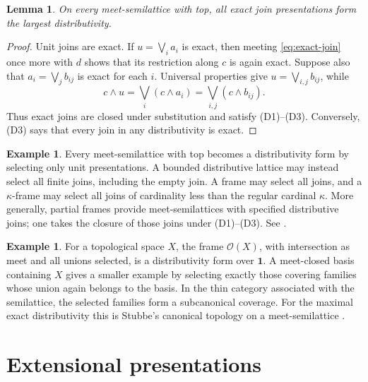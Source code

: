 \documentclass[12pt,oneside,reqno]{amsart}
\newtheorem{lemma}[theorem]{Lemma}
\theoremstyle{definition}
\newtheorem{example}[theorem]{Example}
\theoremstyle{remark}
\begin{document}
\begin{lemma}\label{lem:maximal-exact-distributivity}
On every meet-semilattice with top, all exact join presentations form
the largest distributivity.
\end{lemma}

\begin{proof}
Unit joins are exact.  If \(u=\bigvee_i a_i\) is exact, then meeting
\eqref{eq:exact-join} once more with \(d\) shows that its restriction
along \(c\) is again exact.  Suppose also that
\(a_i=\bigvee_jb_{ij}\) is exact for each \(i\).  Universal properties
give \(u=\bigvee_{i,j}b_{ij}\), while
\[
 c\wedge u
 =\bigvee_i(c\wedge a_i)
 =\bigvee_{i,j}(c\wedge b_{ij}).
\]
Thus exact joins are closed under substitution and satisfy (D1)--(D3).
Conversely, (D3) says that every join in any distributivity is exact.
\end{proof}

\begin{example}\label{ex:terminal-examples}
Every meet-semilattice with top becomes a distributivity form by
selecting only unit presentations.  A bounded distributive lattice may
instead select all finite joins, including the empty join.  A frame may
select all joins, and a \(\kappa\)-frame may select all joins of
cardinality less than the regular cardinal \(\kappa\).  More generally,
partial frames provide meet-semilattices with specified distributive
joins; one takes the closure of those joins under (D1)--(D3).  See
\cite{Zenk,SchauerteFrith,FrithSchauerteMadden}.
\end{example}

\begin{example}\label{ex:open-set-form}
For a topological space \(X\), the frame \(\mathcal O(X)\), with
intersection as meet and all unions selected, is a distributivity form
over \(\mathbf1\).  A meet-closed basis containing \(X\) gives a
smaller example by selecting exactly those covering families whose
union again belongs to the basis.  In the thin category associated with
the semilattice, the selected families form a subcanonical coverage.
For the maximal exact distributivity this is Stubbe's canonical
topology on a meet-semilattice \cite{Stubbe}.
\end{example}

\section{Extensional presentations}
\label{sec:extensional-presentations}
\end{document}
